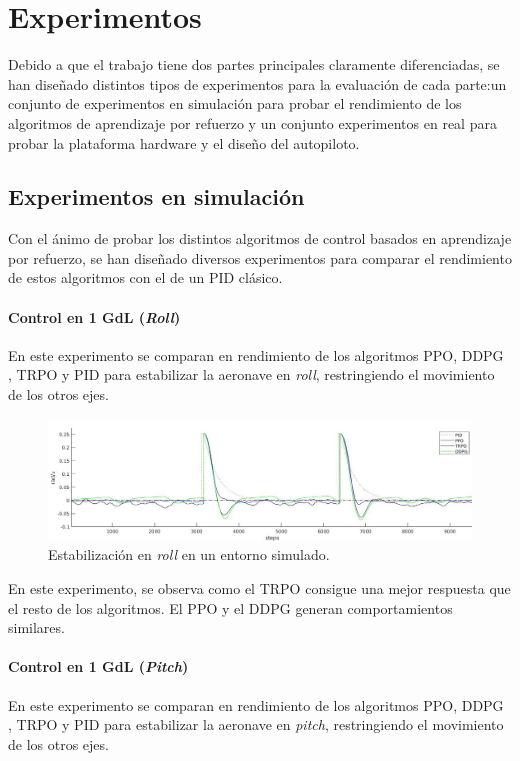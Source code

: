 \chapter{Experimentos}
Debido a que el trabajo tiene dos partes principales claramente diferenciadas, se han diseñado distintos tipos de experimentos para la evaluación de cada parte:un conjunto de experimentos en simulación para probar el rendimiento de los algoritmos de aprendizaje por refuerzo y un conjunto experimentos en real para probar la plataforma hardware y el diseño del autopiloto.
\section{Experimentos en simulación}
Con el ánimo de probar los distintos algoritmos de control basados en aprendizaje por refuerzo, se han diseñado diversos experimentos para comparar el rendimiento de estos algoritmos con el de un PID clásico. 
\subsubsection{Control en 1 GdL (\textit{Roll})}

En este experimento se comparan en rendimiento de los algoritmos PPO, DDPG , TRPO y PID para estabilizar la aeronave en \textit{roll}, restringiendo el movimiento de los otros ejes. 

\begin{figure}[htb!]
	\centering
	\includegraphics[width=\textwidth]{experimentos/sim_onlyroll}
	\caption{Estabilización en \textit{roll} en un entorno simulado.}
	\label{mat_lab_graph}	
\end{figure}

En este experimento, se observa como el TRPO consigue una mejor respuesta que el resto de los algoritmos. El PPO y el DDPG generan comportamientos similares.
\newpage
\subsubsection{Control en 1 GdL (\textit{Pitch})}

En este experimento se comparan en rendimiento de los algoritmos PPO, DDPG , TRPO y PID para estabilizar la aeronave en \textit{pitch}, restringiendo el movimiento de los otros ejes. 

